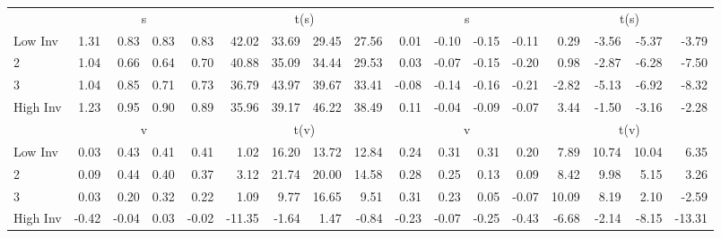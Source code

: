 \begin{table}[!ht]
\begin{tabular}{lrrrrrrrrrrrrrrrr}
  
    
      & \multicolumn{4}{c}{s} & \multicolumn{4}{c}{t(s)}
    
      & \multicolumn{4}{c}{s} & \multicolumn{4}{c}{t(s)}
    
    \\
      \cmidrule(r){2-5} \cmidrule(r){6-9} \cmidrule(r){10-13} \cmidrule(r){14-17}

    Low Inv   & 1.31  & 0.83  & 0.83  & 0.83  & 42.02  & 33.69  & 29.45  & 27.56  & 0.01  & -0.10  & -0.15  & -0.11  & 0.29  & -3.56  & -5.37  & -3.79  \\
           2  & 1.04  & 0.66  & 0.64  & 0.70  & 40.88  & 35.09  & 34.44  & 29.53  & 0.03  & -0.07  & -0.15  & -0.20  & 0.98  & -2.87  & -6.28  & -7.50  \\
           3  & 1.04  & 0.85  & 0.71  & 0.73  & 36.79  & 43.97  & 39.67  & 33.41  & -0.08  & -0.14  & -0.16  & -0.21  & -2.82  & -5.13  & -6.92  & -8.32  \\
    High Inv  & 1.23  & 0.95  & 0.90  & 0.89  & 35.96  & 39.17  & 46.22  & 38.49  & 0.11  & -0.04  & -0.09  & -0.07  & 3.44  & -1.50  & -3.16  & -2.28  \\

  
    
      & \multicolumn{4}{c}{v} & \multicolumn{4}{c}{t(v)}
    
      & \multicolumn{4}{c}{v} & \multicolumn{4}{c}{t(v)}
    
    \\
      \cmidrule(r){2-5} \cmidrule(r){6-9} \cmidrule(r){10-13} \cmidrule(r){14-17}

    Low Inv   & 0.03  & 0.43  & 0.41  & 0.41  & 1.02  & 16.20  & 13.72  & 12.84  & 0.24  & 0.31  & 0.31  & 0.20  & 7.89  & 10.74  & 10.04  & 6.35  \\
           2  & 0.09  & 0.44  & 0.40  & 0.37  & 3.12  & 21.74  & 20.00  & 14.58  & 0.28  & 0.25  & 0.13  & 0.09  & 8.42  & 9.98  & 5.15  & 3.26  \\
           3  & 0.03  & 0.20  & 0.32  & 0.22  & 1.09  & 9.77  & 16.65  & 9.51  & 0.31  & 0.23  & 0.05  & -0.07  & 10.09  & 8.19  & 2.10  & -2.59  \\
    High Inv  & -0.42  & -0.04  & 0.03  & -0.02  & -11.35  & -1.64  & 1.47  & -0.84  & -0.23  & -0.07  & -0.25  & -0.43  & -6.68  & -2.14  & -8.15  & -13.31  \\

  

  \bottomrule
\end{tabular}
\label{tbl:32_Size_OP_Inv_F93}
\end{table}
